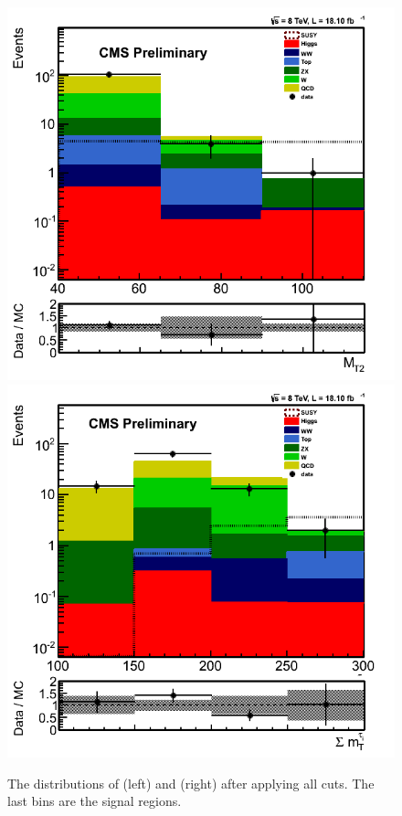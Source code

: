 \begin{figure}[!Hhtb]
\centering
\includegraphics[angle=0,scale=0.35]{TauTauFigs/MT2_SSQCD.png}
\includegraphics[angle=0,scale=0.35]{TauTauFigs/SumMT_SSQCD.png} \\
\caption{The distributions of \mttwo (left) and \SumMT (right) after applying all cuts. The last bins are the signal regions.}
\label{fig:comparison}
\end{figure}
